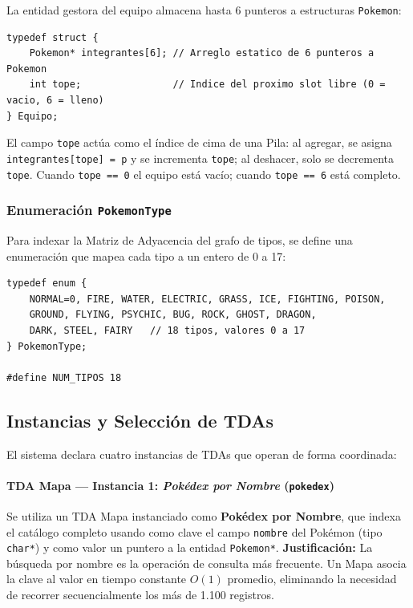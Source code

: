 \documentclass[12pt, letterpaper]{article}
\begin{document}
La entidad gestora del equipo almacena hasta 6 punteros a estructuras \texttt{Pokemon}:

\begin{lstlisting}[caption={Definición del \texttt{struct Equipo} en \texttt{pokehash.h}}]
typedef struct {
    Pokemon* integrantes[6]; // Arreglo estatico de 6 punteros a Pokemon
    int tope;                // Indice del proximo slot libre (0 = vacio, 6 = lleno)
} Equipo;
\end{lstlisting}

El campo \texttt{tope} actúa como el índice de cima de una Pila: al agregar, se asigna \texttt{integrantes[tope] = p} y se incrementa \texttt{tope}; al deshacer, solo se decrementa \texttt{tope}. Cuando \texttt{tope == 0} el equipo está vacío; cuando \texttt{tope == 6} está completo.

\subsubsection{Enumeración \texttt{PokemonType}}

Para indexar la Matriz de Adyacencia del grafo de tipos, se define una enumeración que mapea cada tipo a un entero de 0 a 17:

\begin{lstlisting}[caption={Enumeración \texttt{PokemonType} en \texttt{pokehash.h}}]
typedef enum {
    NORMAL=0, FIRE, WATER, ELECTRIC, GRASS, ICE, FIGHTING, POISON,
    GROUND, FLYING, PSYCHIC, BUG, ROCK, GHOST, DRAGON,
    DARK, STEEL, FAIRY   // 18 tipos, valores 0 a 17
} PokemonType;

#define NUM_TIPOS 18
\end{lstlisting}

\subsection{Instancias y Selección de TDAs}

El sistema declara cuatro instancias de TDAs que operan de forma coordinada:

\paragraph{TDA Mapa --- Instancia 1: \emph{Pokédex por Nombre} (\texttt{pokedex})}
Se utiliza un TDA Mapa instanciado como \textbf{Pokédex por Nombre}, que indexa el catálogo completo usando como clave el campo \texttt{nombre} del Pokémon (tipo \texttt{char*}) y como valor un puntero a la entidad \texttt{Pokemon*}. \textbf{Justificación:} La búsqueda por nombre es la operación de consulta más frecuente. Un Mapa asocia la clave al valor en tiempo constante $O(1)$ promedio, eliminando la necesidad de recorrer secuencialmente los más de 1.100 registros.
\end{document}
